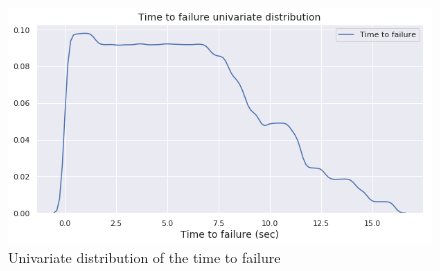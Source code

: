 \documentclass[]{llncs} %
\begin{document}
\begin{figure}
	\centering
	\includegraphics[width=.9\linewidth]{timeToFailureDistribution}
	\caption{Univariate distribution of the time to failure}
	\label{fig:timeToFailureDistribution}
\end{figure}
\clearpage
\newpage
\end{document}
